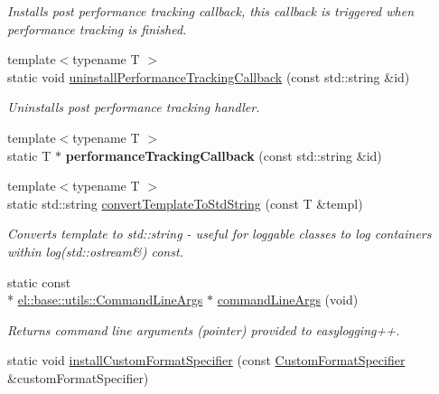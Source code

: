 \begin{DoxyCompactItemize}
\begin{DoxyCompactList}\small\item\em Installs post performance tracking callback, this callback is triggered when performance tracking is finished. \end{DoxyCompactList}\item 
\hypertarget{classel_1_1Helpers_af1c5a4951991179dca4879ba05fb67a6}{{\footnotesize template$<$typename T $>$ }\\static void \hyperlink{classel_1_1Helpers_af1c5a4951991179dca4879ba05fb67a6}{uninstall\-Performance\-Tracking\-Callback} (const std\-::string \&id)}\label{classel_1_1Helpers_af1c5a4951991179dca4879ba05fb67a6}

\begin{DoxyCompactList}\small\item\em Uninstalls post performance tracking handler. \end{DoxyCompactList}\item 
\hypertarget{classel_1_1Helpers_a007844d35095b26301c9218b29d74049}{{\footnotesize template$<$typename T $>$ }\\static T $\ast$ {\bfseries performance\-Tracking\-Callback} (const std\-::string \&id)}\label{classel_1_1Helpers_a007844d35095b26301c9218b29d74049}

\item 
\hypertarget{classel_1_1Helpers_a8b032e32cd042ddc4fef4e814bad1082}{{\footnotesize template$<$typename T $>$ }\\static std\-::string \hyperlink{classel_1_1Helpers_a8b032e32cd042ddc4fef4e814bad1082}{convert\-Template\-To\-Std\-String} (const T \&templ)}\label{classel_1_1Helpers_a8b032e32cd042ddc4fef4e814bad1082}

\begin{DoxyCompactList}\small\item\em Converts template to std\-::string -\/ useful for loggable classes to log containers within log(std\-::ostream\&) const. \end{DoxyCompactList}\item 
\hypertarget{classel_1_1Helpers_a83bab44f77a4961f8f5231e7ce9917bb}{static const \\*
\hyperlink{classel_1_1base_1_1utils_1_1CommandLineArgs}{el\-::base\-::utils\-::\-Command\-Line\-Args} $\ast$ \hyperlink{classel_1_1Helpers_a83bab44f77a4961f8f5231e7ce9917bb}{command\-Line\-Args} (void)}\label{classel_1_1Helpers_a83bab44f77a4961f8f5231e7ce9917bb}

\begin{DoxyCompactList}\small\item\em Returns command line arguments (pointer) provided to easylogging++. \end{DoxyCompactList}\item 
\hypertarget{classel_1_1Helpers_aa6de15a09db4f2a6763a6652c0ea12b1}{static void \hyperlink{classel_1_1Helpers_aa6de15a09db4f2a6763a6652c0ea12b1}{install\-Custom\-Format\-Specifier} (const \hyperlink{classel_1_1CustomFormatSpecifier}{Custom\-Format\-Specifier} \&custom\-Format\-Specifier)}\label{classel_1_1Helpers_aa6de15a09db4f2a6763a6652c0ea12b1}


\end{DoxyCompactItemize}
